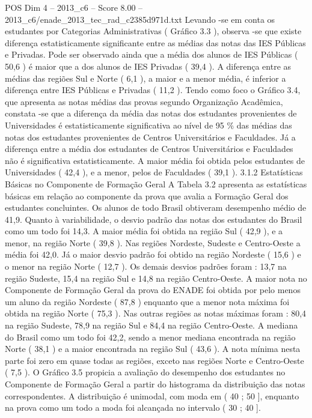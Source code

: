 \begin{textsample}{POS Dim 4 – 2013\_c6 – Score 8.00 – 2013\_c6/enade\_2013\_tec\_rad\_c2385d971d.txt}
Levando -se em conta os estudantes por Categorias Administrativas ( Gráfico 3.3 ), observa -se que existe diferença estatisticamente significante entre as médias das notas das IES Públicas e Privadas.
Pode ser observado ainda que a média dos alunos de IES Públicas ( 50,6 ) é maior que a dos alunos de IES Privadas ( 39,4 ).
A diferença entre as médias das regiões Sul e Norte ( 6,1 ), a maior e a menor média, é inferior a diferença entre IES Públicas e Privadas ( 11,2 ).
Tendo como foco o Gráfico 3.4, que apresenta as notas médias das provas segundo Organização Acadêmica, constata -se que a diferença da média das notas dos estudantes provenientes de Universidades é estatisticamente significativa ao nível de 95 \% das médias das notas dos estudantes provenientes de Centros Universitários e Faculdades.
Já a diferença entre a média dos estudantes de Centros Universitários e Faculdades não é significativa estatisticamente.
A maior média foi obtida pelos estudantes de Universidades ( 42,4 ), e a menor, pelos de Faculdades ( 39,1 ). 3.1.2 Estatísticas Básicas no Componente de Formação Geral A Tabela 3.2 apresenta as estatísticas básicas em relação ao componente da prova que avalia a Formação Geral dos estudantes concluintes.
Os alunos de todo Brasil obtiveram desempenho médio de 41,9.
Quanto à variabilidade, o desvio padrão das notas dos estudantes do Brasil como um todo foi 14,3.
A maior média foi obtida na região Sul ( 42,9 ), e a menor, na região Norte ( 39,8 ).
Nas regiões Nordeste, Sudeste e Centro-Oeste a média foi 42,0.
Já o maior desvio padrão foi obtido na região Nordeste ( 15,6 ) e o menor na região Norte ( 12,7 ).
Os demais desvios padrões foram : 13,7 na região Sudeste, 15,4 na região Sul e 14,8 na região Centro-Oeste.
A maior nota no Componente de Formação Geral da prova do ENADE foi obtida por pelo menos um aluno da região Nordeste ( 87,8 ) enquanto que a menor nota máxima foi obtida na região Norte ( 75,3 ).
Nas outras regiões as notas máximas foram : 80,4 na região Sudeste, 78,9 na região Sul e 84,4 na região Centro-Oeste.
A mediana do Brasil como um todo foi 42,2, sendo a menor mediana encontrada na região Norte ( 38,1 ) e a maior encontrada na região Sul ( 43,6 ).
A nota mínima nesta parte foi zero em quase todas as regiões, exceto nas regiões Norte e Centro-Oeste ( 7,5 ).
O Gráfico 3.5 propicia a avaliação do desempenho dos estudantes no Componente de Formação Geral a partir do histograma da distribuição das notas correspondentes.
A distribuição é unimodal, com moda em ( 40 ; 50 ], enquanto na prova como um todo a moda foi alcançada no intervalo ( 30 ; 40 ].

\end{textsample}
